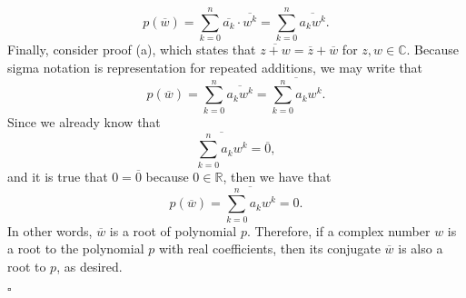 \documentclass[12pt]{exam}
\begin{document}
\begin{questions}
\begin{parts}
\begin{equation*}
p(\overline w) = \sum\limits_{k=0}^n \overline{ a_k} \cdot \overline {w^k} = \sum\limits_{k=0}^n \overline{ a_k w^k}. 
\end{equation*}
Finally, consider proof (a), which states that $\overline{z+w} = \overline z + \overline w$ for $z,w \in \mathbb C$. Because sigma notation is representation for repeated additions, we may write that 
\begin{equation*}
p(\overline w) =  \sum\limits_{k=0}^n \overline{ a_k w^k} =  \overline{\sum\limits_{k=0}^n  a_k w^k}. 
\end{equation*}
Since we already know that
\begin{equation*}
\overline{\sum\limits_{k=0}^n  a_k w^k} = \overline 0, 
\end{equation*}
and it is true that $0 = \overline 0$ because $0 \in \mathbb {R}$, then we have that 
\begin{equation*}
p(\overline w) = \overline{\sum\limits_{k=0}^n  a_k w^k} = 0.
\end{equation*}
In other words, $\overline w$ is a root of polynomial $p$. Therefore, if a complex number $w$ is a root to the polynomial $p$ with real coefficients, then its conjugate $\overline w$ is also a root to $p$, as desired.
\begin{flushright}
$\square$
\end{flushright}
\end{parts}

\end{questions}
\end{document}
